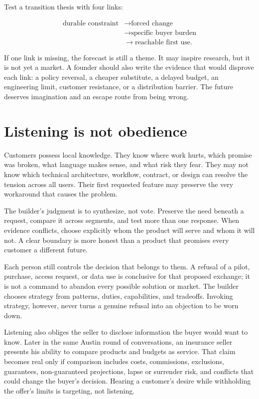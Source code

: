 Test a transition thesis with four links:

\begin{equation}
\begin{aligned}
\text{durable constraint}&\longrightarrow \text{forced change}\\
&\longrightarrow \text{specific buyer burden}\\
&\longrightarrow \text{reachable first use}.
\end{aligned}
\end{equation}

If one link is missing, the forecast is still a theme. It may inspire research,
but it is not yet a market. A founder should also write the evidence that would
disprove each link: a policy reversal, a cheaper substitute, a delayed budget,
an engineering limit, customer resistance, or a distribution barrier. The
future deserves imagination and an escape route from being wrong.

\section{Listening is not obedience}

Customers possess local knowledge. They know where work hurts, which promise
was broken, what language makes sense, and what risk they fear. They may not
know which technical architecture, workflow, contract, or design can resolve
the tension across all users. Their first requested feature may preserve the
very workaround that causes the problem.

The builder's judgment is to synthesize, not vote. Preserve the need beneath a
request, compare it across segments, and test more than one response. When
evidence conflicts, choose explicitly whom the product will serve and whom it
will not. A clear boundary is more honest than a product that promises every
customer a different future.

Each person still controls the decision that belongs to them. A refusal of a
pilot, purchase, access request, or data use is conclusive for that proposed
exchange; it is not a command to abandon every possible solution or market.
The builder chooses strategy from patterns, duties, capabilities, and tradeoffs.
Invoking strategy, however, never turns a genuine refusal into an objection to
be worn down.

Listening also obliges the seller to disclose information the buyer would want
to know. Later in the same Austin round of conversations, an insurance seller
presents his ability to compare products and budgets as service. That claim
becomes real only if comparison includes costs, commissions, exclusions,
guarantees, non-guaranteed projections, lapse or surrender risk, and conflicts
that could change the buyer's decision. Hearing a customer's desire while
withholding the offer's limits is targeting, not listening.

